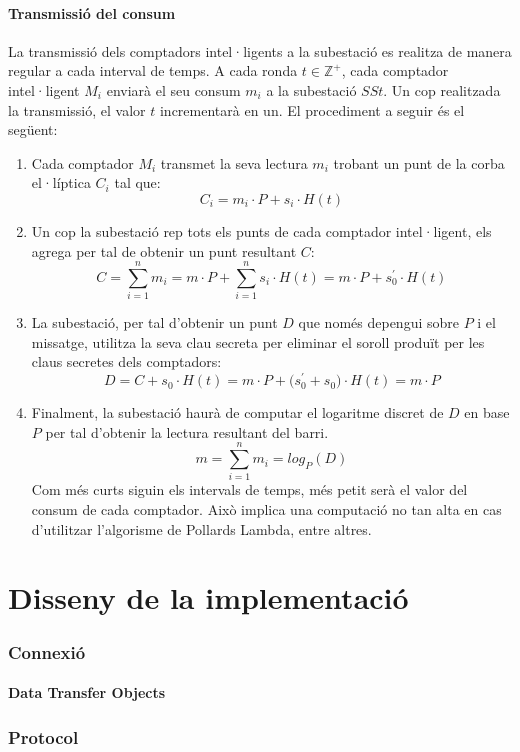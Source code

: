 \documentclass{article}
\begin{document}
\subsection{Transmissió del consum}\label{section:ct}
La transmissió dels comptadors intel·ligents a la subestació es realitza de manera regular a cada interval de temps. A cada ronda $t \in \mathbb{Z^+}$, cada comptador intel·ligent $M_i$ enviarà el seu consum $m_i$ a la subestació $SSt$. Un cop realitzada la transmissió, el valor $t$ incrementarà en un. El procediment a seguir és el següent:
\begin{enumerate}
	\item Cada comptador $M_i$ transmet la seva lectura $m_i$ trobant un punt de la corba el·líptica $C_i$ tal que:
	\[C_i = m_i \cdot P + s_i \cdot H(t)\]
	\item Un cop la subestació rep tots els punts de cada comptador intel·ligent, els agrega per tal de obtenir un punt resultant $C$:
	\[C = \sum_{i=1}^{n}m_i = m \cdot P + \sum_{i=1}^{n}s_i \cdot H(t) = m \cdot P + s_0^{'}\cdot H(t)\]
	\item La subestació, per tal d'obtenir un punt $D$ que només depengui sobre $P$ i el missatge, utilitza la seva clau secreta per eliminar el soroll produït per les claus secretes dels comptadors:
	\[D = C + s_0 \cdot H(t) = m \cdot P + \big( s_0^{'} + s_0 \big) \cdot H(t) = m \cdot P\]
	\item Finalment, la subestació haurà de computar el logaritme discret de $D$ en base $P$ per tal d'obtenir la lectura resultant del barri.
	\[m = \sum_{i=1}^{n} m_i = log_P(D)\]
	Com més curts siguin els intervals de temps, més petit serà el valor del consum de cada comptador. Això implica una computació no tan alta en cas d'utilitzar l'algorisme de Pollards Lambda, entre altres.
\end{enumerate}

\part{Disseny de la implementació}\label{part:disseny}

\section{Connexió}
\subsection{Data Transfer Objects}
\section{Protocol}
\end{document}
